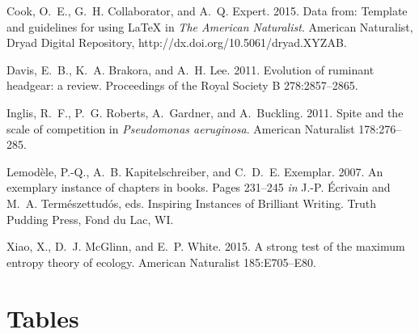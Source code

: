 \documentclass[11pt]{article}
\begin{document}
\begin{thebibliography}{}

Cook, O.~E., G.~H. Collaborator, and A.~Q. Expert. 2015.
\newblock Data from: Template and guidelines for using \LaTeX{} in \textit{The American Naturalist}.
\newblock American Naturalist, Dryad Digital Repository, http://dx.doi.org/10.5061/dryad.XYZAB.

Davis, E.~B., K.~A. Brakora, and A.~H. Lee. 2011.
\newblock Evolution of ruminant headgear: a review.
\newblock Proceedings of the Royal Society B 278:2857--2865.

Inglis, R.~F., P.~G. Roberts, A.~Gardner, and A.~Buckling. 2011.
\newblock Spite and the scale of competition in \textit{Pseudomonas
  aeruginosa}.
\newblock American Naturalist 178:276--285.

Lemod\`{e}le, P.-Q., A.~B. Kapitelschreiber, and C.~D.~E. Exemplar. 2007.
\newblock An exemplary instance of chapters in books.
\newblock Pages 231--245 \emph{in} J.-P. \'{E}crivain and M.~A. Term\'{e}szettud\'{o}s, eds. Inspiring Instances of Brilliant Writing. Truth Pudding Press, Fond du Lac, WI.

Xiao, X., D.~J. McGlinn, and E.~P. White. 2015.
\newblock A strong test of the maximum entropy theory of ecology.
\newblock American Naturalist 185:E705--E80.

\end{thebibliography}

\newpage{}

\section*{Tables}
\renewcommand{\thetable}{\arabic{table}}
\setcounter{table}{0}
\end{document}
